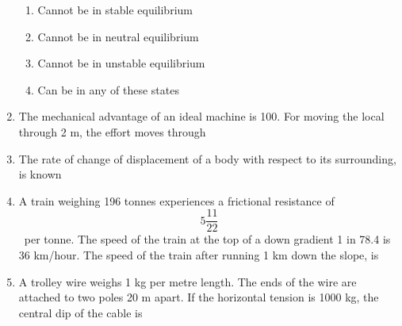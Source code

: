\documentclass[11pt,a4paper]{article}
\begin{document}
\begin{enumerate}
\begin{enumerate}[label=\Alph*.]
\item{Cannot be in stable equilibrium}
\item{Cannot be in neutral equilibrium}
\item{Cannot be in unstable equilibrium}
\item{Can be in any of these states}
\end{enumerate}
\item{The mechanical advantage of an ideal machine is 100. For moving the local through 2 m, the effort moves through}
\\
\item{The rate of change of displacement of a body with respect to its surrounding, is known}
\\
\item{A train weighing 196 tonnes experiences a frictional resistance of $$5\frac{{11}}{{22}}$$ ~per tonne. The speed of the train at the top of a down gradient 1 in 78.4 is 36 km/hour. The speed of the train after running 1 km down the slope, is}
\\
\item{A trolley wire weighs 1 kg per metre length. The ends of the wire are attached to two poles 20 m apart. If the horizontal tension is 1000 kg, the central dip of the cable is}
\\\begin{enumerate*}[itemjoin=\qquad, label=\Alph*.]

\end{enumerate*}
\end{enumerate}
\end{document}
